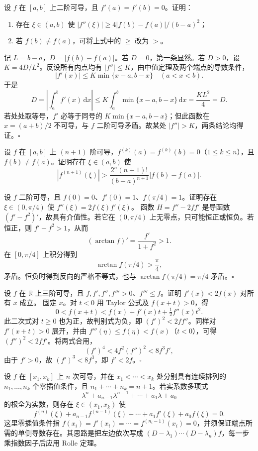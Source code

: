 设 $f$ 在 $[a,b]$ 上二阶可导，且 $f'(a)=f'(b)=0$。证明：
\begin{enumerate}[label=（\roman*）,leftmargin=3em]
\item 存在 $\xi\in(a,b)$ 使 $|f''(\xi)|\geq4|f(b)-f(a)|/(b-a)^2$；
\item 若 $f(b)\ne f(a)$，可将上式中的 $\geq$ 改为 $>$。
\end{enumerate}
\pf 记 $L=b-a$，$D=|f(b)-f(a)|$。若 $D=0$，第一条显然。若 $D>0$，设 $K=4D/L^2$。反设所有内点均有 $|f''|\leq K$，由中值定理及两个端点的导数条件，
\[
|f'(x)|\leq K\min\{x-a,b-x\}\quad(a<x<b).
\]
于是
\[
D=\left|\int_a^bf'(x)\,\mathrm dx\right|
\leq K\int_a^b\min\{x-a,b-x\}\,\mathrm dx=\frac{KL^2}{4}=D.
\]
若处处取等号，$f'$ 必等于同号的 $K\min\{x-a,b-x\}$；但此函数在 $x=(a+b)/2$ 不可导，与 $f$ 二阶可导矛盾。故某处 $|f''|>K$，两条结论均得证。\hfill$\square$

设 $f$ 在 $[a,b]$ 上 $(n+1)$ 阶可导，$f^{(k)}(a)=f^{(k)}(b)=0$（$1\leq k\leq n$），且 $f(b)\ne f(a)$。证明存在 $\xi\in(a,b)$ 使
\[
|f^{(n+1)}(\xi)|>
\frac{2^n(n+1)!}{(b-a)^{n+1}}|f(b)-f(a)|.
\]

设 $f$ 二阶可导，且 $f(0)=0$、$f'(0)=1$、$f(\pi/4)=1$。证明存在 $\xi\in(0,\pi/4)$ 使 $f''(\xi)=2f(\xi)f'(\xi)$。
\pf 函数 $H=f''-2ff'$ 是导函数 $(f'-f^2)'$，故具有介值性。若它在 $(0,\pi/4)$ 上无零点，只可能恒正或恒负。若恒正，则 $f'-f^2>1$，从而
\[
(\arctan f)'=\frac{f'}{1+f^2}>1.
\]
在 $[0,\pi/4]$ 上积分得到
\[
\arctan f(\pi/4)>\frac\pi4,
\]
矛盾。恒负时得到反向的严格不等式，也与 $\arctan f(\pi/4)=\pi/4$ 矛盾。\hfill$\square$

设 $f$ 在 $\mathbb R$ 上三阶可导，且 $f,f',f'',f'''>0$、$f'''\leq f$。证明 $f'(x)<2f(x)$ 对所有 $x$ 成立。
\pf 固定 $x$。对 $t<0$ 用 Taylor 公式及 $f(x+t)>0$，得
\[
0<f(x+t)<f(x)+f'(x)t+\tfrac12f''(x)t^2.
\]
此二次式对 $t\geq0$ 也为正，故判别式为负，即 $(f')^2<2ff''$。同样对 $f'(x+t)>0$ 展开，并由 $f'''(\eta)\leq f(\eta)<f(x)$（$t<0$），可得 $(f'')^2<2ff'$。将两式合用，
\[
(f')^4<4f^2(f'')^2<8f^3f',
\]
由于 $f'>0$，故 $(f')^3<8f^3$，即 $f'<2f$。\hfill$\square$

设 $f$ 在 $[x_1,x_k]$ 上 $n$ 次可导，并在 $x_1<\cdots<x_k$ 处分别具有连续排列的 $n_1,\ldots,n_k$ 个零插值条件，且 $n_1+\cdots+n_k=n+1$。若实系数多项式
\[
\lambda^n+a_{n-1}\lambda^{n-1}+\cdots+a_1\lambda+a_0
\]
的根全为实数，则存在 $\xi\in(x_1,x_k)$ 使
\[
f^{(n)}(\xi)+a_{n-1}f^{(n-1)}(\xi)+\cdots+a_1f'(\xi)+a_0f(\xi)=0.
\]
这里零插值条件指 $f(x_i)=f'(x_i)=\cdots=f^{(n_i-1)}(x_i)=0$，并须保证端点所需的单侧导数存在。其思路是把左边依次写成 $(D-\lambda_1)\cdots(D-\lambda_n)f$，每一步乘指数因子后应用 Rolle 定理。

